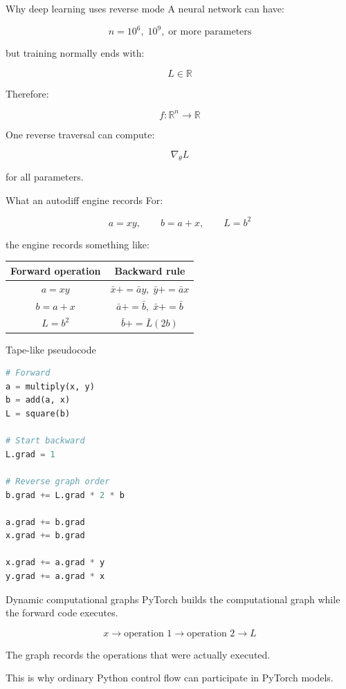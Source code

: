 \documentclass[10pt,aspectratio=169]{beamer}
\newcommand{\adj}[1]{\bar{#1}}
\begin{document}
\begin{frame}[t]{Why deep learning uses reverse mode}
A neural network can have:

\[
n=10^6,\;10^9,\;\text{or more parameters}
\]

but training normally ends with:

\[
L\in\mathbb{R}
\]

Therefore:

\[
f:\mathbb{R}^{n}\rightarrow\mathbb{R}
\]

One reverse traversal can compute:

\[
\boxed{\nabla_\theta L}
\]

for all parameters.
\end{frame}

\begin{frame}[t]{What an autodiff engine records}
For:

\[
a=xy,
\qquad
b=a+x,
\qquad
L=b^2
\]

the engine records something like:

\small

\begin{center}
\begin{tabular}{c c}
\toprule
Forward operation & Backward rule \\
\midrule
\(a=xy\)
&
\(\adj{x}{+}=\adj{a}y,\;
  \adj{y}{+}=\adj{a}x\)
\\[0.15cm]
\(b=a+x\)
&
\(\adj{a}{+}=\adj{b},\;
  \adj{x}{+}=\adj{b}\)
\\[0.15cm]
\(L=b^2\)
&
\(\adj{b}{+}=\adj{L}(2b)\)
\\
\bottomrule
\end{tabular}
\end{center}
\end{frame}

\begin{frame}[fragile,t]{Tape-like pseudocode}
\begin{lstlisting}[language=Python]
# Forward
a = multiply(x, y)
b = add(a, x)
L = square(b)

# Start backward
L.grad = 1

# Reverse graph order
b.grad += L.grad * 2 * b

a.grad += b.grad
x.grad += b.grad

x.grad += a.grad * y
y.grad += a.grad * x
\end{lstlisting}
\end{frame}

\begin{frame}[t]{Dynamic computational graphs}
PyTorch builds the computational graph while the forward code executes.

\[
x
\rightarrow
\text{operation 1}
\rightarrow
\text{operation 2}
\rightarrow
L
\]

The graph records the operations that were actually executed.

\vfill

This is why ordinary Python control flow can participate in PyTorch models.
\end{frame}
\end{document}
